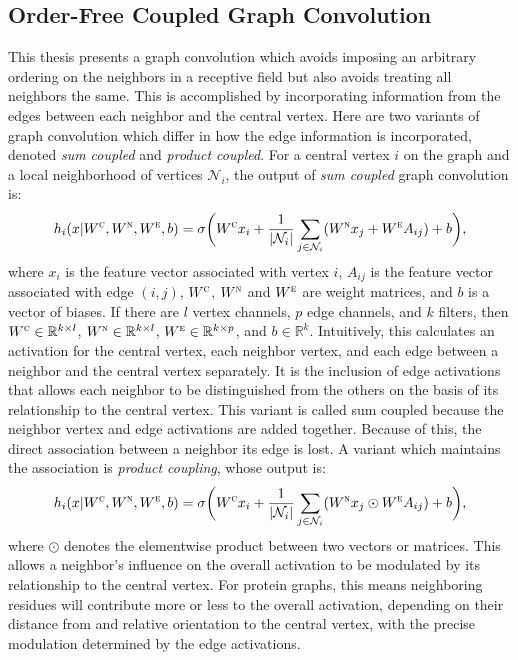 \subsection{Order-Free Coupled Graph Convolution}
This thesis presents a graph convolution which avoids imposing an arbitrary ordering on the neighbors in a receptive field but also avoids treating all neighbors the same.
This is accomplished by incorporating information from the edges between each neighbor and the central vertex.
Here are two variants of graph convolution which differ in how the edge information is incorporated, denoted \textit{sum coupled} and \textit{product coupled}.
For a central vertex $i$ on the graph and a local neighborhood of vertices $\mathcal{N}_i$, the output of \emph{sum coupled} graph convolution is:
\begin{equation}
h_i(x | W^\textsc{c}, W^\textsc{n}, W^\textsc{e}, b) = \sigma \bigg( W^{\textsc{c}} x_i + \frac{1}{|\mathcal{N}_i|}\sum_{j \in \mathcal{N}_i} (W^{\textsc{n}} x_j + W^{\textsc{e}} A_{ij}) + b \bigg),
\label{eq:sum_coupling}
\end{equation}
where $x_i$ is the feature vector associated with vertex $i$, $A_{ij}$ is the feature vector associated with edge $(i, j)$, $W^\textsc{c}$, $W^\textsc{n}$ and $W^\textsc{e}$ are weight matrices, and $b$ is a vector of biases. 
If there are $l$ vertex channels, $p$ edge channels, and $k$ filters, then $W^\textsc{c}\in\mathbb{R}^{k \times l}$, $W^\textsc{n}\in\mathbb{R}^{k \times l}$, $W^\textsc{e}\in\mathbb{R}^{k \times p}$, and $b\in\mathbb{R}^{k}$.
Intuitively, this calculates an activation for the central vertex, each neighbor vertex, and each edge between a neighbor and the central vertex separately.
It is the inclusion of edge activations that allows each neighbor to be distinguished from the others on the basis of its relationship to the central vertex.
This variant is called sum coupled because the neighbor vertex and edge activations are added together.
Because of this, the direct association between a neighbor its edge is lost.
A variant which maintains the association is \emph{product coupling}, whose output is:
\begin{equation}
h_i(x | W^\textsc{c}, W^\textsc{n}, W^\textsc{e}, b) = \sigma \bigg( W^{\textsc{c}} x_i + \frac{1}{|\mathcal{N}_i|}\sum_{j \in \mathcal{N}_i} (W^{\textsc{n}} x_j \odot W^{\textsc{e}} A_{ij}) + b \bigg),
\label{eq:prod_coupling}
\end{equation}
where $\odot$ denotes the elementwise product between two vectors or matrices. 
This allows a neighbor's influence on the overall activation to be modulated by its relationship to the central vertex.
For protein graphs, this means neighboring residues will contribute more or less to the overall activation, depending on their distance from and relative orientation to the central vertex, with the precise modulation determined by the edge activations.

